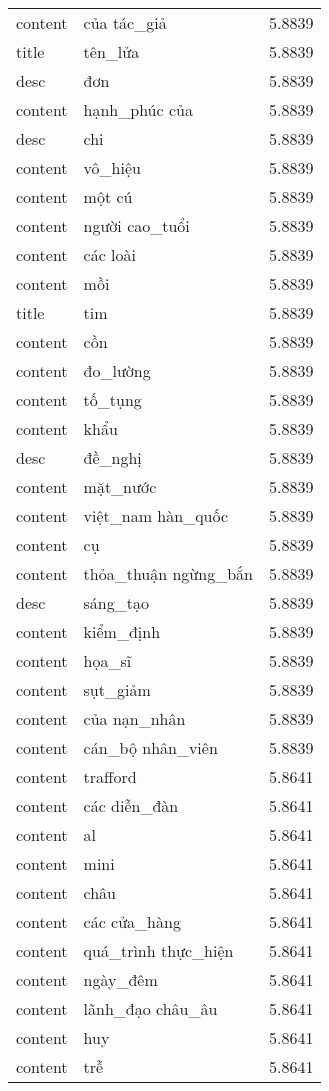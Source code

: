 \documentclass{article}
\begin{document}
\begin{tabular}{lll}
content & của tác\_giả & 5.8839\\
title & tên\_lửa & 5.8839\\
desc & đơn & 5.8839\\
content & hạnh\_phúc của & 5.8839\\
desc & chi & 5.8839\\
content & vô\_hiệu & 5.8839\\
content & một cú & 5.8839\\
content & người cao\_tuổi & 5.8839\\
content & các loài & 5.8839\\
content & mồi & 5.8839\\
title & tim & 5.8839\\
content & cồn & 5.8839\\
content & đo\_lường & 5.8839\\
content & tố\_tụng & 5.8839\\
content & khẩu & 5.8839\\
desc & đề\_nghị & 5.8839\\
content & mặt\_nước & 5.8839\\
content & việt\_nam hàn\_quốc & 5.8839\\
content & cụ & 5.8839\\
content & thỏa\_thuận ngừng\_bắn & 5.8839\\
desc & sáng\_tạo & 5.8839\\
content & kiểm\_định & 5.8839\\
content & họa\_sĩ & 5.8839\\
content & sụt\_giảm & 5.8839\\
content & của nạn\_nhân & 5.8839\\
content & cán\_bộ nhân\_viên & 5.8839\\
content & trafford & 5.8641\\
content & các diễn\_đàn & 5.8641\\
content & al & 5.8641\\
content & mini & 5.8641\\
content & châu & 5.8641\\
content & các cửa\_hàng & 5.8641\\
content & quá\_trình thực\_hiện & 5.8641\\
content & ngày\_đêm & 5.8641\\
content & lãnh\_đạo châu\_âu & 5.8641\\
content & huy & 5.8641\\
content & trễ & 5.8641\\

\end{tabular}
\end{document}
